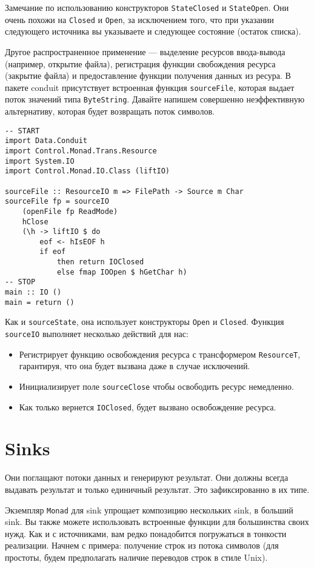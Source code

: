 Замечание по использованию конструкторов \lstinline=StateClosed= и \lstinline=StateOpen=.
Они очень похожи на
\lstinline=Closed= и \lstinline=Open=, за исключением того, что при указании следующего
источника вы указываете и следующее состояние (остаток списка).

Другое распространенное применение --- выделение ресурсов ввода-вывода (например,
открытие файла), регистрация функции свобождения ресурса (закрытие файла) и
предоставление функции получения данных из ресура.
В пакете conduit присутствует встроенная функция \verb=sourceFile=, которая выдает поток
значений типа \lstinline=ByteString=. Давайте напишем совершенно неэффективную
альтернативу, которая будет возвращать поток символов.

\begin{lstlisting}
-- START
import Data.Conduit
import Control.Monad.Trans.Resource
import System.IO
import Control.Monad.IO.Class (liftIO)

sourceFile :: ResourceIO m => FilePath -> Source m Char
sourceFile fp = sourceIO
    (openFile fp ReadMode)
    hClose
    (\h -> liftIO $ do
        eof <- hIsEOF h
        if eof
            then return IOClosed
            else fmap IOOpen $ hGetChar h)
-- STOP
main :: IO ()
main = return ()
\end{lstlisting}

Как и \verb=sourceState=, она использует конструкторы \verb*|Open| и \verb*|Closed|.
Функция \lstinline=sourceIO= выполняет несколько действий для нас:
\begin{itemize}
 \item Регистрирует функцию освобождения ресурса с трансформером \lstinline=ResourceT=,
гарантируя, что она будет вызвана даже в случае исключений.
 \item Инициализирует поле \lstinline=sourceClose= чтобы освободить ресурс немедленно.
 \item Как только вернется \lstinline=IOClosed=, будет вызвано освобождение ресурса.
\end{itemize}
  
\section{Sinks}

Они поглащают потоки данных и генерируют результат. Они должны всегда выдавать результат
и только единичный результат. Это зафиксированно в их типе.

Экземпляр \lstinline=Monad= для sink упрощает композицию нескольких sink, в больший sink.
Вы также
можете использовать встроенные функции для большинства своих нужд. Как и с источниками,
вам редко понадобится погружаться в тонкости реализации. Начнем с примера:
получение строк из потока символов (для простоты, будем предполагать наличие переводов
строк в стиле Unix).


